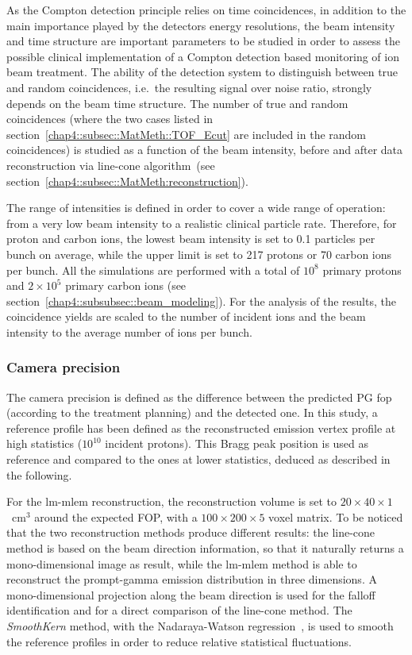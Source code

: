 As the Compton detection principle relies on time coincidences, in addition to the main importance played by the detectors energy resolutions, the beam intensity and time structure are important parameters to be studied in order to assess the possible clinical implementation of a Compton detection based monitoring of ion beam treatment. The ability of the detection system to distinguish between true and random coincidences, i.e.~the resulting signal over noise ratio, strongly depends on the beam time structure. The number of true and random coincidences (where the two cases listed in section~\ref{chap4::subsec::MatMeth::TOF_Ecut} are included in the random coincidences) is studied as a function of the beam intensity, before and after data reconstruction via line-cone algorithm~(see section~\ref{chap4::subsec::MatMeth:reconstruction}).

The range of intensities is defined in order to cover a wide range of operation: from a very low beam intensity to a realistic clinical particle rate. Therefore, for proton and carbon ions, the lowest beam intensity is set to 0.1 particles per bunch on average, while the upper limit is set to 217 protons or 70 carbon ions per bunch. All the simulations are performed with a total of $10^{8}$ primary protons and  $2\times10^{5}$ primary carbon ions (see section~\ref{chap4::subsubsec::beam_modeling}). For the analysis of the results, the coincidence yields are scaled to the number of incident ions and the beam intensity to the average number of ions per bunch.

\subsubsection{Camera precision}\label{chap4::subsubsec::MatMeth:precision}

The camera precision is defined as the difference between the predicted PG \gls{fop} (according to the treatment planning) and the detected one.
In this study, a reference profile has been defined as the reconstructed emission vertex profile at high statistics ($\mathrm{10^{10}}$ incident protons). This Bragg peak position is used as reference and compared to the ones at lower statistics, deduced as described in the following.

For the \gls{lm-mlem} reconstruction, the reconstruction volume is set to $20\times40\times1$~cm$^3$ around the expected FOP, with a $100\times200\times5$ voxel matrix. To be noticed that the two reconstruction methods produce different results: the line-cone method is based on the beam direction information, so that it naturally returns a mono-dimensional image as result, while the \gls{lm-mlem} method is able to reconstruct the prompt-gamma emission distribution in three dimensions. A mono-dimensional projection along the beam direction is used for the falloff identification and for a direct comparison of the line-cone method.
The \textit{SmoothKern} method, with the Nadaraya-Watson regression~\parencite{Nadaraya1964, Watson1964}, is used to smooth the reference profiles in order to reduce relative statistical fluctuations.

